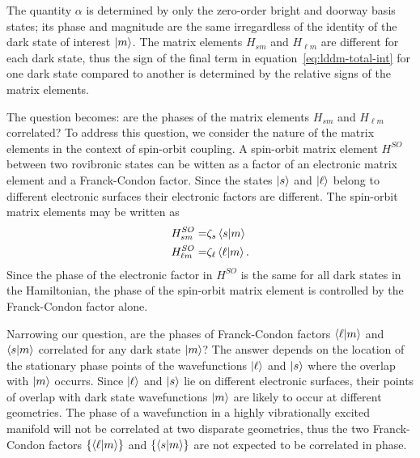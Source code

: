 \documentclass[12pt]{mitthesis}
\begin{document}
The quantity $\alpha$ is determined by only the zero-order bright and
doorway basis states; its phase and magnitude are the same
irregardless of the identity of the dark state of interest $\mathinner{|{m}\rangle}$.
The matrix elements $H_{s m}$ and $H_{\ell m}$ are different for
each dark state, thus the sign of the final term in
equation~\ref{eq:lddm-total-int} for one dark state compared to
another is determined by the relative signs of the matrix elements.

The question becomes: are the phases of the matrix elements $H_{s m}$
and $H_{\ell m}$ correlated?  To address this question, we consider
the nature of the matrix elements in the context of spin-orbit
coupling.  A spin-orbit matrix element $H^{SO}$ between two rovibronic
states can be witten as a factor of an electronic matrix element and a
Franck-Condon factor.  Since the states $\mathinner{|{s}\rangle}$ and $\mathinner{|{\ell}\rangle}$
belong to different electronic surfaces their electronic factors are
different.  The spin-orbit matrix elements may be written as
\begin{subequations}
  \label{eq:spinorbit-factors}
  \begin{align}
    H_{s m}^{SO} =& \zeta_s \mathinner{\langle{s|m}\rangle}\\
    H_{\ell m}^{SO} =& \zeta_\ell \mathinner{\langle{\ell|m}\rangle}.
  \end{align}
\end{subequations}
Since the phase of the electronic factor in $H^{SO}$ is the same for
all dark states in the Hamiltonian, the phase of the spin-orbit matrix
element is controlled by the Franck-Condon factor alone.

Narrowing our question, are the phases of Franck-Condon factors
$\mathinner{\langle{\ell|m}\rangle}$ and $\mathinner{\langle{s|m}\rangle}$ correlated for any dark state
$\mathinner{|{m}\rangle}$?  The answer depends on the location of the stationary phase
points of the wavefunctions $\mathinner{|{\ell}\rangle}$ and $\mathinner{|{s}\rangle}$ where the
overlap with $\mathinner{|{m}\rangle}$ occurrs.  Since $\mathinner{|{\ell}\rangle}$ and $\mathinner{|{s}\rangle}$ lie
on different electronic surfaces, their points of overlap with dark
state wavefunctions $\mathinner{|{m}\rangle}$ are likely to occur at different
geometries.  The phase of a wavefunction in a highly vibrationally
excited manifold will not be correlated at two disparate geometries,
thus the two Franck-Condon factors $\lbrace \mathinner{\langle{\ell|m}\rangle}
\rbrace$ and $\lbrace \mathinner{\langle{s|m}\rangle} \rbrace$ are not expected to be
correlated in phase.
\end{document}

